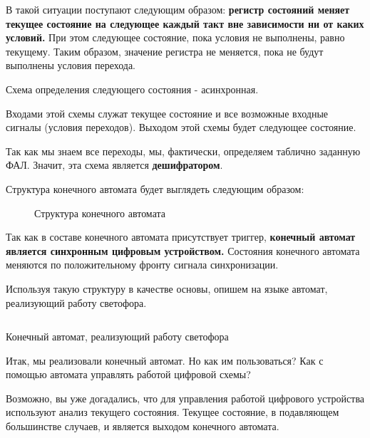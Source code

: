 \par{В такой ситуации поступают следующим образом: \textbf{регистр состояний меняет текущее состояние на следующее каждый такт вне зависимости ни от каких условий.} При этом следующее состояние, пока условия не выполнены, равно текущему. Таким образом, значение регистра не меняется, пока не будут выполнены условия перехода.}

\par{Схема определения следующего состояния - асинхронная.}

\par{Входами этой схемы служат текущее состояние и все возможные входные сигналы (условия переходов). Выходом этой схемы будет следующее состояние.}

\par{Так как мы знаем все переходы, мы, фактически, определяем таблично заданную ФАЛ. Значит, эта схема является \textbf{дешифратором}.}

\par{Структура конечного автомата будет выглядеть следующим образом:}

\begin{figure}[H]
  \centering
  \def\svgwidth{12cm}
  
  \caption{Структура конечного автомата}
\end{figure}

\par{Так как в составе конечного автомата присутствует триггер, \textbf{конечный автомат является синхронным цифровым устройством.} Состояния конечного автомата меняются по положительному фронту сигнала синхронизации.}

\par{Используя такую структуру в качестве основы, опишем на языке  автомат, реализующий работу светофора.}

%

\begin{longlisting}
	\inputminted{SystemVerilog}{code_examples/lab_4/lights.sv}
	\caption{Конечный автомат, реализующий работу светофора}
\end{longlisting}
\bigskip

\par{Итак, мы реализовали конечный автомат. Но как им пользоваться? Как с помощью автомата управлять работой цифровой схемы?}

\par{Возможно, вы уже догадались, что для управления работой цифрового устройства используют анализ текущего состояния. Текущее состояние, в подавляющем большинстве случаев, и является выходом конечного автомата.}


